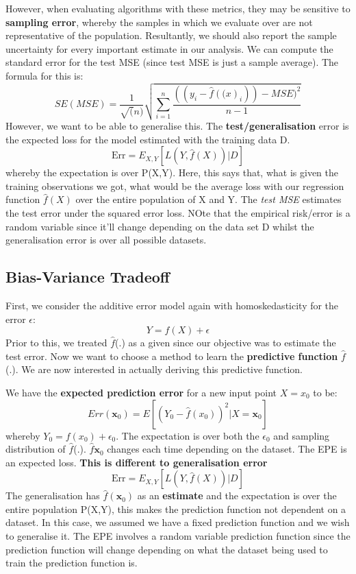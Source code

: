 \documentclass[11pt, oneside]{article}
\theoremstyle{definition}
\begin{document}
However, when evaluating algorithms with these metrics, they may be sensitive to \textbf{sampling error}, whereby the samples in which we evaluate over are not representative of the population. Resultantly, we should also report the sample uncertainty for every important estimate in our analysis. We can compute the standard error for the test MSE (since test MSE is just a sample average). The formula for this is:
$$
SE(MSE) = \frac{1}{\sqrt(n)}\sqrt{\sum\limits_{i=1}^n \frac{((y_i - \hat{f}(\bm(x)_i)) - MSE)^2}{n-1}}
$$
\bigskip
However, we want to be able to generalise this. The \textbf{test/generalisation} error is the expected loss for the model estimated with the training data D.
$$
\text{Err} = E_{X,Y}[L(Y,\hat{f}(X))|D]
$$
whereby the expectation is over P(X,Y). Here, this says that, what is given the training observations we got, what would be the average loss with our regression function $\hat{f}(X)$ over the entire population of X and Y. The \textit{test MSE} estimates the test error under the squared error loss. NOte that the empirical risk/error is a random variable since it'll change depending on the data set D whilst the generalisation error is over all possible datasets.

\subsection{Bias-Variance Tradeoff}
First, we consider the additive error model again with homoskedasticity for the error $\epsilon$:
$$
Y = f(X) + \epsilon
$$
Prior to this, we treated $\hat{f}$(.) as a given since our objective was to estimate the test error. Now we want to choose a method to learn the \textbf{predictive function} $\hat{f}$(.). We are now interested in actually deriving this predictive function.

We have the \textbf{expected prediction error} for a new input point $X = x_0$ to be:
$$
Err(\bm{x}_0) = E[(Y_0 - \hat{f}(x_0))^2|X = \bm{x}_0]
$$
whereby $Y_0 = f(x_0) + \epsilon_0$. The expectation is over both the $\epsilon_0$ and sampling distribution of $\hat{f}$(.). $\hat{f}\bm{x}_0$ changes each time depending on the dataset. The EPE is an expected loss. \textbf{This is different to generalisation error}
$$
\text{Err} = E_{X,Y}[L(Y,\hat{f}(X))|D]
$$
The generalisation has $\hat{f}(\bm{x}_0)$ as an \textbf{estimate} and the expectation is over the entire population P(X,Y), this makes the prediction function not dependent on a dataset. In this case, we assumed we have a fixed prediction function and we wish to generalise it. The EPE involves a random variable prediction function since the prediction function will change depending on what the dataset being used to train the prediction function is.
\end{document}
